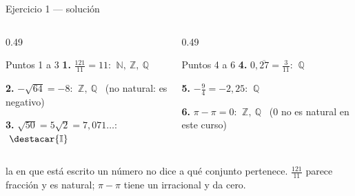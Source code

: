\documentclass[aspectratio=169,10pt]{beamer}
\begin{document}
\begin{frame}{Ejercicio 1 — solución}
  \scriptsize
  \begin{columns}[T,onlytextwidth]
    \begin{column}{0.49\textwidth}
      \begin{block}{Puntos 1 a 3}
        \tiny
        \textbf{1.} $\tfrac{121}{11}=11$:
        $\ \mathbb{N},\ \mathbb{Z},\ \mathbb{Q}$

        \vspace{0.1cm}
        \textbf{2.} $-\sqrt{64}=-8$: $\ \mathbb{Z},\ \mathbb{Q}$
        \ {\color{uniGris}(no natural: es negativo)}

        \vspace{0.1cm}
        \textbf{3.} $\sqrt{50}=5\sqrt{2}=7{,}071\dots$:
        $\ \destacar{\mathbb{I}}$
      \end{block}
    \end{column}
    \begin{column}{0.49\textwidth}
      \begin{block}{Puntos 4 a 6}
        \tiny
        \textbf{4.} $0{,}\overline{27}=\tfrac{3}{11}$: $\ \mathbb{Q}$

        \vspace{0.1cm}
        \textbf{5.} $-\tfrac{9}{4}=-2{,}25$: $\ \mathbb{Q}$

        \vspace{0.1cm}
        \textbf{6.} $\pi-\pi = 0$:
        $\ \mathbb{Z},\ \mathbb{Q}$
        \ {\color{uniGris}($0$ no es natural en este curso)}
      \end{block}
    \end{column}
  \end{columns}

  \vspace{0.1cm}
  {\tiny\color{uniGris}  la
   en que está escrito un número no dice a qué conjunto pertenece.
  $\tfrac{121}{11}$ parece fracción y es natural; $\pi-\pi$ tiene un
  irracional y da cero.}
\end{frame}
\end{document}
